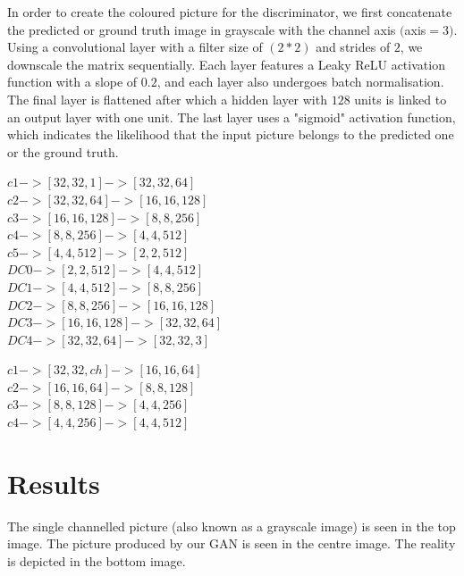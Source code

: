 \documentclass[conference]{IEEEtran}
\begin{document}
In order to create the coloured picture for the discriminator, we first concatenate the predicted or ground truth image in grayscale with the channel axis $($axis$=3)$. Using a convolutional layer with a filter size of $(2*2)$ and strides of $2$, we downscale the matrix sequentially. Each layer features a Leaky ReLU activation function with a slope of $0.2$, and each layer also undergoes batch normalisation. The final layer is flattened after which a hidden layer with $128$ units is linked to an output layer with one unit. The last layer uses a "sigmoid" activation function, which indicates the likelihood that the input picture belongs to the predicted one or the ground truth.

\begin{center}
$c1 -> [32,32,1] -> [32,32,64]$ \\
$c2 -> [32,32,64] -> [16,16,128]$ \\
$c3 -> [16,16,128] -> [8,8,256]$ \\
$c4 -> [8,8,256] -> [4,4,512]$ \\
$c5 -> [4,4,512] -> [2,2,512]$ \\
$DC0 -> [2,2,512] -> [4,4,512]$ \\
$DC1 -> [4,4,512] -> [8,8,256]$ \\
$DC2 -> [8,8,256] -> [16,16,128]$ \\
$DC3 -> [16,16,128] -> [32,32,64]$ \\
$DC4 -> [32,32,64] -> [32,32,3]$ \\
\end{center}

\begin{center}
$c1 -> [32,32,ch] -> [16,16,64]$ \\
$c2 -> [16,16,64] -> [8,8,128]$ \\
$c3 -> [8,8,128] -> [4,4,256]$ \\
$c4 -> [4,4,256] -> [4,4,512]$ \\
\end{center}

\section{Results}\label{Results}
The single channelled picture (also known as a grayscale image) is seen in the top image.
The picture produced by our GAN is seen in the centre image.
The reality is depicted in the bottom image.
\end{document}
